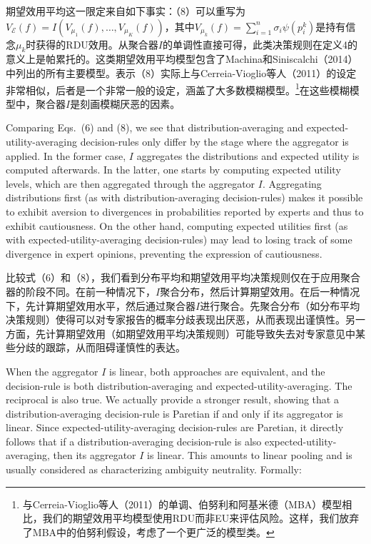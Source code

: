 \documentclass[12pt,a4paper]{article}
\newenvironment{original}
  {\par\noindent\ignorespaces}
  {\par}
\newenvironment{translation}
  {\par\noindent{\color{transblue}\ignorespaces}}
  {\par\medskip}
\begin{document}
\begin{translation}
期望效用平均这一限定来自如下事实：（8）可以重写为$V_{\mathcal{E}}(f) = I(V_{\mu_{1}}(f), \dots, V_{\mu_{K}}(f))$，其中$V_{\mu_{k}}(f) = \sum_{i=1}^{n} \sigma_{i} \psi(p^{k}_{i})$是持有信念$\mu_{k}$时获得的RDU效用。从聚合器$I$的单调性直接可得，此类决策规则在定义4的意义上是帕累托的。这类期望效用平均模型包含了Machina和Siniscalchi（2014）中列出的所有主要模型。表示（8）实际上与Cerreia-Vioglio等人（2011）的设定非常相似，后者是一个非常一般的设定，涵盖了大多数模糊模型。\footnote{与Cerreia-Vioglio等人（2011）的单调、伯努利和阿基米德（MBA）模型相比，我们的期望效用平均模型使用RDU而非EU来评估风险。这样，我们放弃了MBA中的伯努利假设，考虑了一个更广泛的模型类。}在这些模糊模型中，聚合器$I$是刻画模糊厌恶的因素。
\end{translation}

\begin{original}
Comparing Eqs.\ (6) and (8), we see that distribution-averaging and expected-utility-averaging decision-rules only differ by the stage where the aggregator is applied. In the former case, $I$ aggregates the distributions and expected utility is computed afterwards. In the latter, one starts by computing expected utility levels, which are then aggregated through the aggregator $I$. Aggregating distributions first (as with distribution-averaging decision-rules) makes it possible to exhibit aversion to divergences in probabilities reported by experts and thus to exhibit cautiousness. On the other hand, computing expected utilities first (as with expected-utility-averaging decision-rules) may lead to losing track of some divergence in expert opinions, preventing the expression of cautiousness.
\end{original}

\begin{translation}
比较式（6）和（8），我们看到分布平均和期望效用平均决策规则仅在于应用聚合器的阶段不同。在前一种情况下，$I$聚合分布，然后计算期望效用。在后一种情况下，先计算期望效用水平，然后通过聚合器$I$进行聚合。先聚合分布（如分布平均决策规则）使得可以对专家报告的概率分歧表现出厌恶，从而表现出谨慎性。另一方面，先计算期望效用（如期望效用平均决策规则）可能导致失去对专家意见中某些分歧的跟踪，从而阻碍谨慎性的表达。
\end{translation}

\begin{original}
When the aggregator $I$ is linear, both approaches are equivalent, and the decision-rule is both distribution-averaging and expected-utility-averaging. The reciprocal is also true. We actually provide a stronger result, showing that a distribution-averaging decision-rule is Paretian if and only if its aggregator is linear. Since expected-utility-averaging decision-rules are Paretian, it directly follows that if a distribution-averaging decision-rule is also expected-utility-averaging, then its aggregator $I$ is linear. This amounts to linear pooling and is usually considered as characterizing ambiguity neutrality. Formally:
\end{original}
\end{document}
